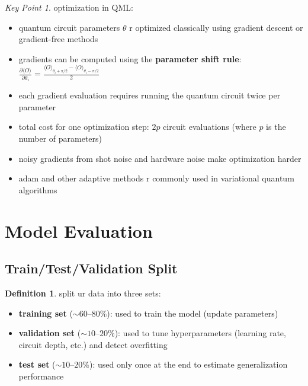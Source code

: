 \documentclass[11pt,a4paper]{article}
\theoremstyle{definition}
\newtheorem{definition}{Definition}[section]
\theoremstyle{remark}
\newtheorem*{keypoint}{Key Point}
\begin{document}
\begin{keypoint}
optimization in QML:
\begin{itemize}
    \item quantum circuit parameters $\theta$ r optimized classically using gradient descent or gradient-free methods
    \item gradients can be computed using the \textbf{parameter shift rule}: $\frac{\partial \langle O \rangle}{\partial \theta_i} = \frac{\langle O \rangle_{\theta_i + \pi/2} - \langle O \rangle_{\theta_i - \pi/2}}{2}$
    \item each gradient evaluation requires running the quantum circuit twice per parameter
    \item total cost for one optimization step: $2p$ circuit evaluations (where $p$ is the number of parameters)
    \item noisy gradients from shot noise and hardware noise make optimization harder
    \item adam and other adaptive methods r commonly used in variational quantum algorithms
\end{itemize}
\end{keypoint}

\section{Model Evaluation}

\subsection{Train/Test/Validation Split}

\begin{definition}
split ur data into three sets:
\begin{itemize}
    \item \textbf{training set} ($\sim 60$--$80\%$): used to train the model (update parameters)
    \item \textbf{validation set} ($\sim 10$--$20\%$): used to tune hyperparameters (learning rate, circuit depth, etc.) and detect overfitting
    \item \textbf{test set} ($\sim 10$--$20\%$): used only once at the end to estimate generalization performance
\end{itemize}
\end{definition}
\end{document}
